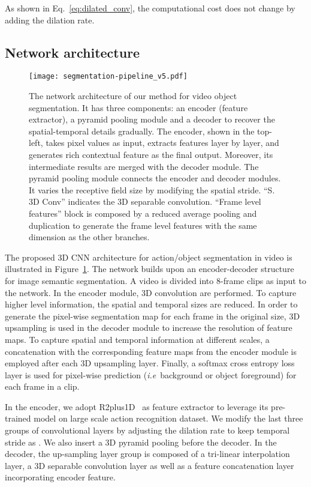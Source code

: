 \documentclass{bmvc2k}
\def\ie{\emph{i.e}\bmvaOneDot}
\begin{document}
As shown in Eq.~\ref{eq:dilated_conv}, the computational cost does not change by adding the dilation rate. 



\subsection{Network architecture}
\label{sec:network}


\begin{figure}[!t]
\centering
\texttt{[image: segmentation-pipeline\_v5.pdf]}
\caption{The network architecture of our method for video object segmentation. It has three components: an encoder (feature extractor), a pyramid pooling module and a decoder to recover the spatial-temporal details gradually. The encoder, shown in the top-left, takes pixel values as input, extracts features layer by layer, and generates rich contextual feature as the final output. Moreover, its intermediate results are merged with the decoder module. The pyramid pooling module connects the encoder and decoder modules. It varies the receptive field size by modifying the spatial stride. ``S. 3D Conv'' indicates the 3D separable convolution. ``Frame level features'' block is composed by a reduced average pooling and duplication to generate the frame level features with the same dimension as the other branches.
}
\label{fig:segmentation}
\end{figure}


The proposed 3D CNN architecture for action/object segmentation in video is illustrated in Figure~\ref{fig:segmentation}.
The network builds upon an encoder-decoder structure for image semantic segmentation. 
A video is divided into 8-frame clips as input to the network. In the encoder module, 3D convolution are performed. To capture higher level information, the spatial and temporal sizes are reduced. In order to generate the pixel-wise segmentation map for each frame in the original size, 3D upsampling is used in the decoder module to increase the resolution of feature maps. To capture spatial and temporal information at different scales, a concatenation with the corresponding feature maps from the encoder module is employed after each 3D upsampling layer. Finally, a softmax cross entropy loss layer is used for pixel-wise prediction (\ie~background or object foreground) for each frame in a clip.

In the encoder, we adopt R2plus1D~\cite{r2plus1d_cvpr18} as feature extractor to leverage its pre-trained model on large scale action recognition dataset. We modify the last three groups of convolutional layers by adjusting the dilation rate to keep temporal stride as .
We also insert a 3D pyramid pooling before the decoder. 
In the decoder, the up-sampling layer group is composed of a tri-linear interpolation layer, a 3D separable convolution layer as well as a feature concatenation layer incorporating encoder feature. 
\end{document}
